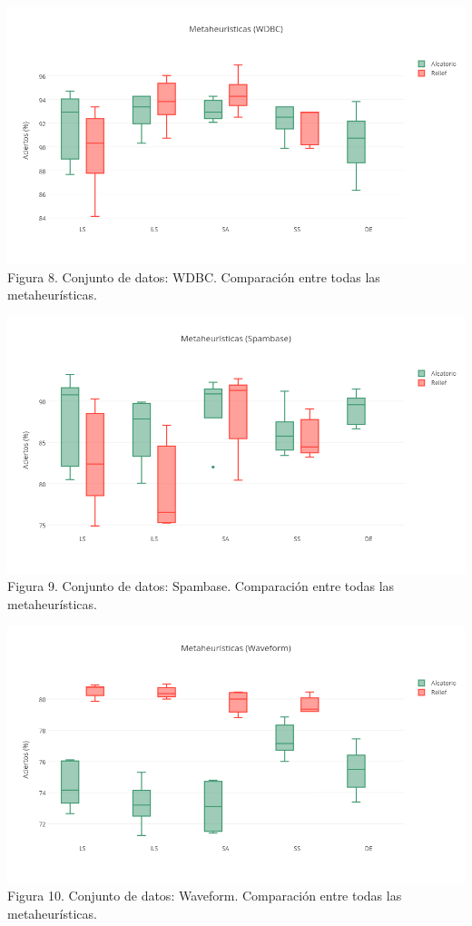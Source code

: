 \documentclass{ci5652}
\begin{document}
\includegraphics[width=\columnwidth]{metaheuristicas_WDBC}
Figura 8. Conjunto de datos: WDBC. Comparación entre todas las metaheurísticas.

\includegraphics[width=\columnwidth]{metaheuristicas_Spambase}
Figura 9. Conjunto de datos: Spambase. Comparación entre todas las metaheurísticas.

\includegraphics[width=\columnwidth]{metaheuristicas_Waveform}
Figura 10. Conjunto de datos: Waveform. Comparación entre todas las metaheurísticas.
\end{document}
